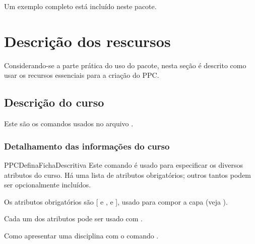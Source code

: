 \documentclass[a4paper, 11pt]{article}
\begin{document}
Um exemplo completo está incluído neste pacote.


\section{Descrição dos rescursos}
Considerando-se a parte prática do uso do pacote, nesta seção é descrito como usar os recursos essenciais para a criação do PPC.

\subsection{Descrição do curso}

Este são os comandos usados no arquivo .

\subsubsection{Detalhamento das informações do curso}

\begin{Macrodef}{PPCDefinaFichaDescritiva}{}{}
    Este comando é usado para especificar os diversos atributos do curso. Há uma lista de atributos obrigatórios; outros tantos podem ser opcionalmente incluídos.

    Os atributos obrigatórios são [{ e }{, }{ e }{}]{\mbox{\texttt{\atributo}}}, usado para compor a capa (veja ).

    Cada um dos atributos pode ser usado com .
\end{Macrodef}

\begin{PDListing}
\end{PDListing}

Como apresentar uma disciplina com o comando .
\end{document}

